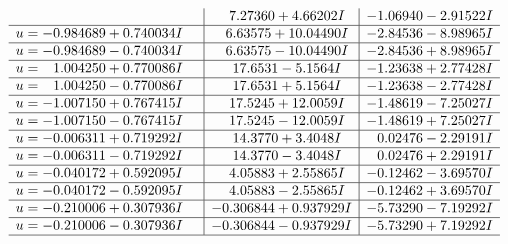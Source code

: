 \documentclass[1p]{elsarticle_modified}
\theoremstyle{definition}
\begin{document}
$$\begin{array}{c|c|c}
 & \phantom{-}7.27360 + 4.66202 I & -1.06940 - 2.91522 I \\ \hline\begin{aligned}
u &= -0.984689 + 0.740034 I\end{aligned}
 & \phantom{-}6.63575 + 10.04490 I & -2.84536 - 8.98965 I \\ \hline\begin{aligned}
u &= -0.984689 - 0.740034 I\end{aligned}
 & \phantom{-}6.63575 - 10.04490 I & -2.84536 + 8.98965 I \\ \hline\begin{aligned}
u &= \phantom{-}1.004250 + 0.770086 I\end{aligned}
 & \phantom{-}17.6531 - 5.1564 I & -1.23638 + 2.77428 I \\ \hline\begin{aligned}
u &= \phantom{-}1.004250 - 0.770086 I\end{aligned}
 & \phantom{-}17.6531 + 5.1564 I & -1.23638 - 2.77428 I \\ \hline\begin{aligned}
u &= -1.007150 + 0.767415 I\end{aligned}
 & \phantom{-}17.5245 + 12.0059 I & -1.48619 - 7.25027 I \\ \hline\begin{aligned}
u &= -1.007150 - 0.767415 I\end{aligned}
 & \phantom{-}17.5245 - 12.0059 I & -1.48619 + 7.25027 I \\ \hline\begin{aligned}
u &= -0.006311 + 0.719292 I\end{aligned}
 & \phantom{-}14.3770 + 3.4048 I & \phantom{-}0.02476 - 2.29191 I \\ \hline\begin{aligned}
u &= -0.006311 - 0.719292 I\end{aligned}
 & \phantom{-}14.3770 - 3.4048 I & \phantom{-}0.02476 + 2.29191 I \\ \hline\begin{aligned}
u &= -0.040172 + 0.592095 I\end{aligned}
 & \phantom{-}4.05883 + 2.55865 I & -0.12462 - 3.69570 I \\ \hline\begin{aligned}
u &= -0.040172 - 0.592095 I\end{aligned}
 & \phantom{-}4.05883 - 2.55865 I & -0.12462 + 3.69570 I \\ \hline\begin{aligned}
u &= -0.210006 + 0.307936 I\end{aligned}
 & -0.306844 + 0.937929 I & -5.73290 - 7.19292 I \\ \hline\begin{aligned}
u &= -0.210006 - 0.307936 I\end{aligned}
 & -0.306844 - 0.937929 I & -5.73290 + 7.19292 I\\
 \hline 
 \end{array}$$\newpage
\end{document}
